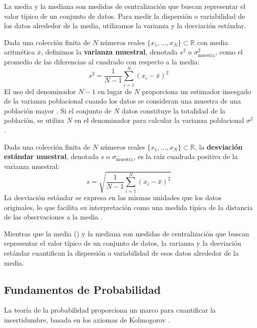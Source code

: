 La media y la mediana son medidas de centralización que buscan representar el valor típico de un conjunto de datos. Para medir la dispersión o variabilidad de los datos alrededor de la media, utilizamos la varianza y la desviación estándar.

\begin{definition}
\label{def:sample_variance}
Dada una colección finita de $N$ números reales $\{x_1, \dots, x_N\} \subset \mathbb{R}$ con media aritmética $\bar{x}$, definimos la \textbf{varianza muestral}, denotada $s^2$ o $\sigma^2_{\text{muestra}}$, como el promedio de las diferencias al cuadrado con respecto a la media:
\[ s^2 = \frac{1}{N-1} \sum_{i=1}^N (x_i - \bar{x})^2 \]
El uso del denominador $N-1$ en lugar de $N$ proporciona un estimador insesgado de la varianza poblacional cuando los datos se consideran una muestra de una población mayor \citep{CasellaBerger2002, Ross2014}. Si el conjunto de $N$ datos constituye la totalidad de la población, se utiliza $N$ en el denominador para calcular la varianza poblacional $\sigma^2$.
\end{definition}

\begin{definition}
\label{def:sample_std_dev}
Dada una colección finita de $N$ números reales $\{x_1, \dots, x_N\} \subset \mathbb{R}$, la \textbf{desviación estándar muestral}, denotada $s$ o $\sigma_{\text{muestra}}$, es la raíz cuadrada positiva de la varianza muestral:
\[ s = \sqrt{\frac{1}{N-1} \sum_{i=1}^N (x_i - \bar{x})^2} \]
La desviación estándar se expresa en las mismas unidades que los datos originales, lo que facilita su interpretación como una medida típica de la distancia de las observaciones a la media \citep{DeGrootSchervish2012}.
\end{definition}

Mientras que la media () y la mediana son medidas de centralización que buscan representar el valor típico de un conjunto de datos, la varianza y la desviación estándar cuantifican la dispersión o variabilidad de esos datos alrededor de la media.

\subsection{Fundamentos de Probabilidad}
\label{subsec:probability_foundations_general}

La teoría de la probabilidad proporciona un marco para cuantificar la incertidumbre, basada en los axiomas de Kolmogorov \citep{Ross2014}.

